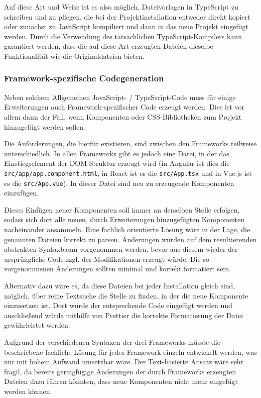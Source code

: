 Auf diese Art und Weise ist es also möglich, Dateivorlagen in TypeScript zu schreiben und zu pflegen, die bei der Projektinstallation entweder direkt kopiert oder zunächst zu JavaScript kompiliert und dann in das neue Projekt eingefügt werden. Durch die Verwendung des tatsächlichen TypeScript-Kompilers kann garantiert werden, dass die auf diese Art erzeugten Dateien dieselbe Funktionalität wie die Originaldateien bieten.

\subsubsection{Framework-spezifische Codegeneration}
Neben solchem Allgemeinen JavaScript- / TypeScript-Code muss für einige Erweiterungen auch Framework-spezifischer Code erzeugt werden. Dies ist vor allem dann der Fall, wenn Komponenten oder CSS-Bibliotheken zum Projekt hinzugefügt werden sollen.

Die Anforderungen, die hierfür existieren, sind zwischen den Frameworks teilweise unterschiedlich. In allen Frameworks gibt es jedoch eine Datei, in der das Einstiegselement der \gls{DOM}-Struktur erzeugt wird (in Angular ist dies die \verb|src/app/app.component.html|, in React ist es die \verb|src/App.tsx| und in Vue.js ist es die \verb|src/App.vue|). In dieser Datei sind neu zu erzeugende Komponenten einzufügen.

Dieses Einfügen neuer Komponenten soll immer an derselben Stelle erfolgen, sodass sich dort alle neuen, durch Erweiterungen hinzugefügten Komponenten nacheinander ansammeln. Eine fachlich orientierte Lösung wäre in der Lage, die genannten Dateien korrekt zu parsen. Änderungen würden auf dem resultierenden abstrakten Syntaxbaum vorgenommen werden, bevor aus diesem wieder der ursprüngliche Code zzgl. der Modifikationen erzeugt würde. Die so vorgenommenen Änderungen sollten minimal und korrekt formatiert sein.

Alternativ dazu wäre es, da diese Dateien bei jeder Installation gleich sind, möglich, über reine Textsuche die Stelle zu finden, in der die neue Komponente einzusetzen ist. Dort würde der entsprechende Code eingefügt werden und anschließend würde mithilfe von Prettier die korrekte Formatierung der Datei gewährleistet werden.

Aufgrund der verschiedenen Syntaxen der drei Frameworks müsste die beschriebene fachliche Lösung für jedes Framework einzeln entwickelt werden, was nur mit hohem Aufwand umsetzbar wäre. Der Text-basierte Ansatz wäre sehr fragil, da bereits geringfügige Änderungen der durch Frameworks erzeugten Dateien dazu führen könnten, dass neue Komponenten nicht mehr eingefügt werden können.


